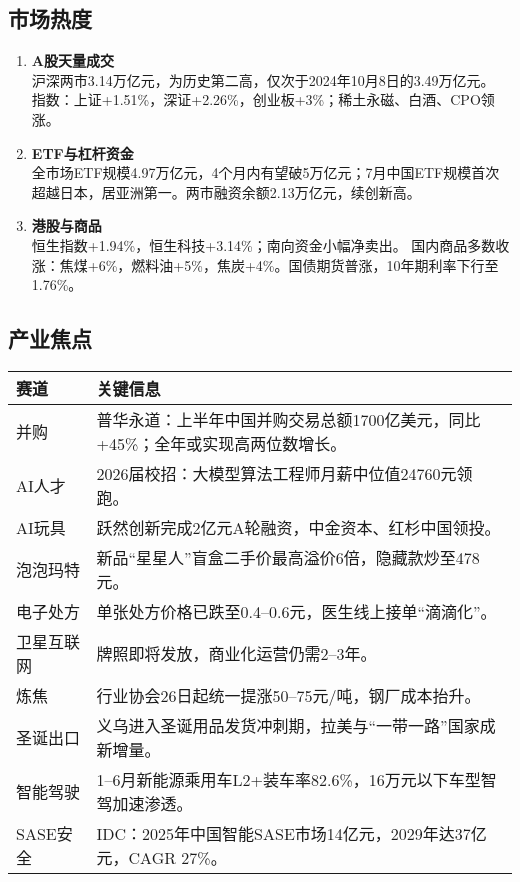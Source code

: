 \subsection{市场热度}
\begin{enumerate}[leftmargin=*, nosep]
    \item \textbf{A股天量成交}  \\
    沪深两市3.14万亿元，为历史第二高，仅次于2024年10月8日的3.49万亿元。  
    指数：上证+1.51\%，深证+2.26\%，创业板+3\%；稀土永磁、白酒、CPO领涨。
    
    \item \textbf{ETF与杠杆资金}  \\
    全市场ETF规模4.97万亿元，4个月内有望破5万亿元；7月中国ETF规模首次超越日本，居亚洲第一。两市融资余额2.13万亿元，续创新高。
    
    \item \textbf{港股与商品}  \\
    恒生指数+1.94\%，恒生科技+3.14\%；南向资金小幅净卖出。  
    国内商品多数收涨：焦煤+6\%，燃料油+5\%，焦炭+4\%。国债期货普涨，10年期利率下行至1.76\%。
\end{enumerate}

\subsection{产业焦点}
\begin{longtable}{@{}p{4cm}p{9cm}@{}}
\toprule
赛道 & 关键信息 \\ \midrule
并购 & 普华永道：上半年中国并购交易总额1700亿美元，同比+45\%；全年或实现高两位数增长。 \\
AI人才 & 2026届校招：大模型算法工程师月薪中位值24760元领跑。 \\
AI玩具 & 跃然创新完成2亿元A轮融资，中金资本、红杉中国领投。 \\
泡泡玛特 & 新品“星星人”盲盒二手价最高溢价6倍，隐藏款炒至478元。 \\
电子处方 & 单张处方价格已跌至0.4–0.6元，医生线上接单“滴滴化”。 \\
卫星互联网 & 牌照即将发放，商业化运营仍需2–3年。 \\
炼焦 & 行业协会26日起统一提涨50–75元/吨，钢厂成本抬升。 \\
圣诞出口 & 义乌进入圣诞用品发货冲刺期，拉美与“一带一路”国家成新增量。 \\
智能驾驶 & 1–6月新能源乘用车L2+装车率82.6\%，16万元以下车型智驾加速渗透。 \\
SASE安全 & IDC：2025年中国智能SASE市场14亿元，2029年达37亿元，CAGR 27\%。 \\ \bottomrule
\end{longtable}

